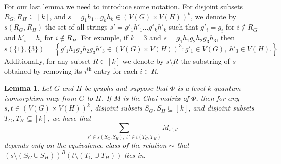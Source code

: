 \documentclass[11pt,a4paper]{article}
\theoremstyle{plain}
\newtheorem{lem}[thm]{Lemma}
\theoremstyle{remark}
\theoremstyle{definition}
\begin{document}
For our last lemma we need to introduce some notation. For disjoint subsets $R_G, R_H \subseteq [k]$, and $s = g_1h_1\ldots g_kh_k \in (V(G) \times V(H))^k$, we denote by $s(R_G,R_H)$ the set of all strings $s' = g'_1h'_1\ldots g'_kh'_k$ such that $g'_i = g_i$ for $i \notin R_G$ and $h'_i = h_i$ for $i \notin R_H$. For example, if $k = 3$ and $s = g_1h_1g_2h_2g_3h_3$, then 
\[s(\{1\},\{3\}) = \left\{g'_1h_1g_2h_2g_3h'_3 \in (V(G) \times V(H))^3 : g'_1 \in V(G), \ h'_3 \in V(H).\right\}\]
Additionally, for any subset $R \in [k]$ we denote by $s\setminus R$ the substring of $s$ obtained by removing its $i^\text{th}$ entry for each $i \in R$.



\begin{lem}\label{lem:Msums}
    Let $G$ and $H$ be graphs and suppose that $\Phi$ is a level $k$ quantum isomorphism map from $G$ to $H$. If $M$ is the Choi matrix of $\Phi$, then for any $s,t \in (V(G) \times V(H))^k$, disjoint subsets $S_G,S_H \subseteq [k]$, and disjoint subsets $T_G,T_H \subseteq [k]$, we have that
    \begin{equation}\label{eq:Msumlem}
        \sum_{s' \in s(S_G,S_H), \ t' \in t(T_G,T_H)} M_{s',t'}
    \end{equation}
    depends only on the equivalence class of the relation $\sim$ that $(s\setminus (S_G \cup S_H))^R(t\setminus (T_G \cup T_H))$ lies in.
\end{lem}
\end{document}
